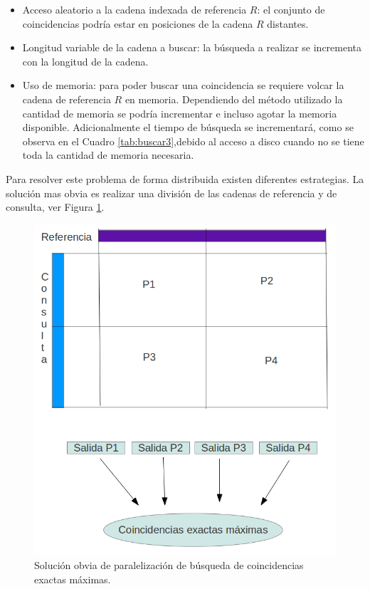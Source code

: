\documentclass[12pt,a4paper]{article}
\begin{document}
\begin{itemize}
  \item Acceso aleatorio a la cadena indexada de referencia $R$: el conjunto de coincidencias
    podría estar en posiciones de la cadena $R$ distantes.
  \item Longitud variable de la cadena a buscar: la búsqueda a realizar se incrementa
    con la longitud de la cadena.
  \item Uso de memoria: para poder buscar una coincidencia se requiere volcar la 
    cadena de referencia $R$ en memoria. Dependiendo del método utilizado la 
    cantidad de memoria se podría incrementar e incluso agotar la memoria disponible.
    Adicionalmente el tiempo de búsqueda se incrementará, como se observa en el 
    Cuadro \ref{tab:buscar3},debido al acceso a disco cuando no se tiene toda la 
    cantidad de memoria necesaria.
\end{itemize}
Para resolver este problema de forma distribuida existen diferentes estrategias. La 
solución mas obvia es realizar una división de las cadenas de referencia y
de consulta, ver Figura \ref{fig:para}.
\begin{figure}[h]
\begin{center}
\includegraphics[scale=0.3]{naive.png}
\caption{Solución obvia de paralelización de búsqueda de coincidencias exactas máximas.}
\label{fig:para}
\end{center}
\end{figure}
\end{document}
